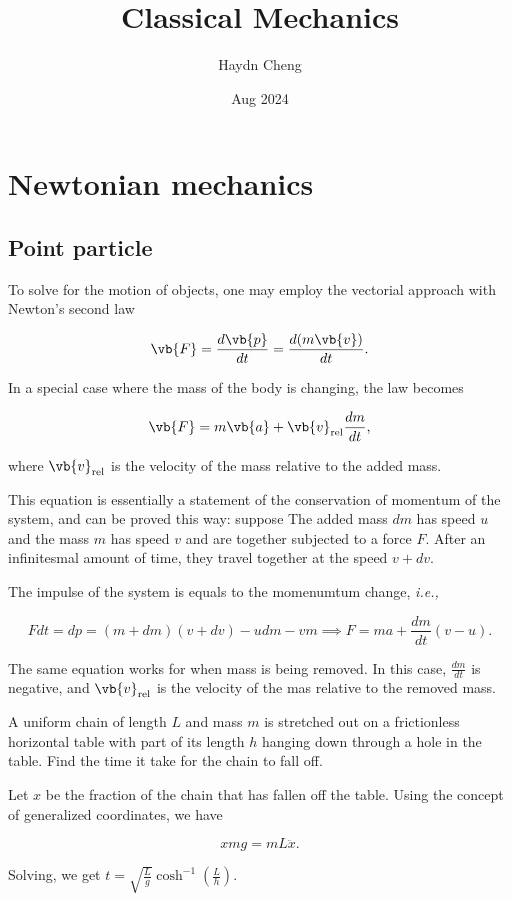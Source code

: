 \documentclass[a4paper,12pt]{report}
\title{Classical Mechanics}
\author{Haydn Cheng}
\date{Aug 2024}
\begin{document}
\maketitle
\tableofcontents
	
\chapter{Newtonian mechanics}
\section{Point particle}

To solve for the motion of objects, one may employ the vectorial approach with Newton's second law

\begin{equation}
	\vb{F} = \frac{d\vb{p} }{dt}  = \frac{d (m\vb{v}) }{d t} . \label{new2} 
\end{equation}

In a special case where the mass of the body is changing, the law becomes

\begin{equation}
	\vb{F} = m\vb{a} + \vb{v} _{\text{rel} } \frac{dm}{dt},  \label{new2prime} 
\end{equation}

where \(\vb{v} _{\text{rel} } \) is the velocity of the mass relative to the added mass.

This equation is essentially a statement of the conservation of momentum of the system, and can be proved this way: suppose The added mass \(dm\) has speed \(u\) and the mass \(m\) has speed \(v\) and are together subjected to a force \(F\). After an infinitesmal amount of time, they travel together at the speed \(v+dv\).

The impulse of the system is equals to the momenumtum change, \textit{i.e.,} 

\begin{equation}
	Fdt= dp = (m+dm)(v+dv)-udm-vm \implies F = ma+\frac{dm}{dt}(v-u).  
\end{equation}

The same equation works for when mass is being removed. In this case, \(\frac{dm}{dt} \) is negative, and \(\vb{v} _{\text{rel} } \) is the velocity of the mas relative to the removed mass.


{A uniform chain of length \(L\) and mass \(m\) is stretched out on a frictionless horizontal table with part of its length \(h\) hanging down through a hole in the table. Find the time it take for the chain to fall off.}
{Let \(x\) be the fraction of the chain that has fallen off the table. Using the concept of generalized coordinates, we have 

\begin{equation}
	xmg = mL \ddot{x}. 
\end{equation}

Solving, we get \(t = \sqrt{\frac{L}{g} } \cosh^{-1} \left( \frac{L}{h}  \right) \).
} 
\end{document}

